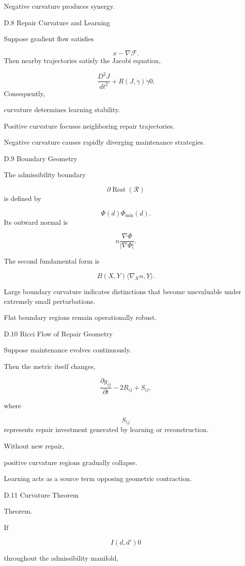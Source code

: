 \documentclass[12pt,oneside]{article}
\theoremstyle{plain}
\theoremstyle{definition}
\theoremstyle{remark}
\DeclareMathOperator{\Rest}{Rest}
\begin{document}
Negative curvature produces synergy.


D.8 Repair Curvature and Learning

Suppose gradient flow satisfies

\[
\dot x
- 
\nabla
\mathcal F.
\]
Then nearby trajectories satisfy the Jacobi equation,

\[
\frac{D^2J}{dt^2}
+
R(J,\dot\gamma)\dot\gamma
0. 
\]
Consequently,

curvature determines learning stability.

Positive curvature focuses neighboring repair trajectories.

Negative curvature causes rapidly diverging maintenance strategies.


D.9 Boundary Geometry

The admissibility boundary

\[
\partial
\Rest(\mathcal R)
\]
is defined by

\[
\Phi(d)
\Phi_{\min}(d).
\]
Its outward normal is

\[
n
\frac{
\nabla\Phi
}
{
|\nabla\Phi|
}.
\]

The second fundamental form is

\[
B(X,Y)
\langle
\nabla_Xn,
Y
\rangle.
\]

Large boundary curvature indicates distinctions that become unevaluable under extremely small perturbations.

Flat boundary regions remain operationally robust.


D.10 Ricci Flow of Repair Geometry

Suppose maintenance evolves continuously.

Then the metric itself changes,

\[
\frac{\partial g_{ij}}
{\partial t}
- 

2R_{ij}
+
S_{ij},
\]

where

\[
S_{ij}
\]
represents repair investment generated by learning or reconstruction.

Without new repair,

positive curvature regions gradually collapse.

Learning acts as a source term opposing geometric contraction.


D.11 Curvature Theorem

Theorem.

If

\[
I(d,d')
0
\]

throughout the admissibility manifold,
\end{document}
